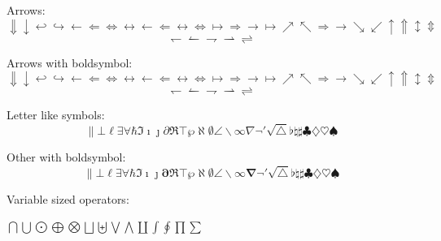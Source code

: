 \documentclass[12pt,a4paper]{article}
\theoremstyle{clearprint}
\begin{document}
\noindent
Arrows: %
\begin{equation}
\Downarrow \downarrow \hookleftarrow \hookrightarrow \leftarrow \Leftarrow \Leftrightarrow \leftrightarrow \longleftarrow \Longleftarrow \longleftrightarrow \Longleftrightarrow \longmapsto \Longrightarrow \longrightarrow \mapsto \nearrow \nwarrow \Rightarrow \rightarrow \searrow \swarrow \uparrow \Uparrow \updownarrow \Updownarrow
\end{equation}
\begin{equation}
\leftharpoondown \leftharpoonup \rightharpoondown \rightharpoonup \rightleftharpoons
\end{equation}

\noindent 
Arrows with boldsymbol:
\begin{equation}
\boldsymbol{\Downarrow \downarrow \hookleftarrow \hookrightarrow \leftarrow \Leftarrow \Leftrightarrow \leftrightarrow \longleftarrow \Longleftarrow \longleftrightarrow \Longleftrightarrow \longmapsto \Longrightarrow \longrightarrow \mapsto \nearrow \nwarrow \Rightarrow \rightarrow \searrow \swarrow \uparrow \Uparrow \updownarrow \Updownarrow}
\end{equation}
\begin{equation}
\boldsymbol{
\leftharpoondown \leftharpoonup \rightharpoondown \rightharpoonup \rightleftharpoons} 
\end{equation}

\noindent 
Letter like symbols: %
\begin{equation}
\| \bot \ell \exists \forall \hbar \Im \imath \jmath \partial \Re \top \wp
\aleph \emptyset \angle \backslash \infty \nabla \neg \prime \surd \triangle
\flat \natural \sharp
\clubsuit \diamondsuit \heartsuit \spadesuit
\end{equation}

\noindent 
Other with boldsymbol:
\begin{equation}
\boldsymbol{\| \bot \ell \exists \forall \hbar \Im \imath \jmath \partial \Re \top \wp
\aleph \emptyset \angle \backslash \infty \nabla \neg \prime \surd \triangle
\flat \natural \sharp
\clubsuit \diamondsuit \heartsuit \spadesuit
}
\end{equation}

\noindent 
Variable sized operators: %
\begin{center}
$\bigcap \bigcup \bigodot \bigoplus \bigotimes \bigsqcup \biguplus \bigvee \bigwedge \coprod \int \oint \prod \sum$ 
\end{center}
\end{document}

